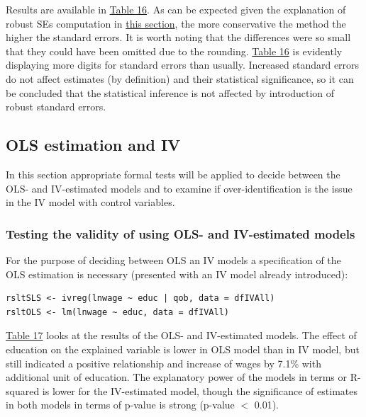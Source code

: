 \documentclass{article}
\begin{document}
Results are available in \hyperref[tab:ivregrobust]{Table 16}. As can be expected given the explanation of robust SEs computation in \hyperref[controlrobustDID]{this section}, the more conservative the method the higher the standard errors. It is worth noting that the differences were so small that they could have been omitted due to the rounding. \hyperref[tab:ivregrobust]{Table 16} is evidently displaying more digits for standard errors than usually. Increased standard errors do not affect estimates (by definition) and their statistical significance, so it can be concluded that the statistical inference is not affected by introduction of robust standard errors.


\subsection{OLS estimation and IV}

In this section appropriate formal tests will be applied to decide between the OLS- and IV-estimated models and to examine if over-identification is the issue in the IV model with control variables.

\subsubsection{Testing the validity of using OLS- and IV-estimated models}

For the purpose of deciding between OLS an IV models a specification of the OLS estimation is necessary (presented with an IV model already introduced):

\begin{verbatim}
rsltSLS <- ivreg(lnwage ~ educ | qob, data = dfIVAll)
rsltOLS <- lm(lnwage ~ educ, data = dfIVAll)
\end{verbatim}

\hyperref[tab:ivregols]{Table 17} looks at the results of the OLS- and IV-estimated models. The effect of education on the explained variable is lower in OLS model than in IV model, but still indicated a positive relationship and increase of wages by 7.1\% with additional unit of education. The explanatory power of the models in terms or R-squared is lower for the IV-estimated model, though the significance of estimates in both models in terms of p-value is strong (p-value $<$ 0.01).
\end{document}
